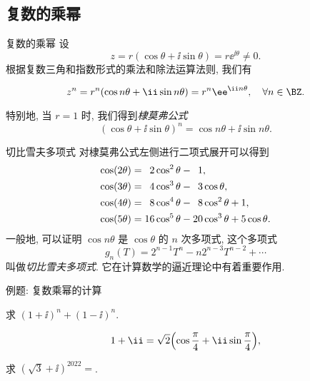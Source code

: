 \subsection{复数的乘幂}


\begin{frame}{复数的乘幂}
	\onslide<+->
	设
	\[
		z=r(\cos\theta+\ii\sin\theta)=r\ee^{\ii\theta}\neq0.
	\]
	\onslide<+->
	根据复数三角和指数形式的乘法和除法运算法则,
	\onslide<+->
	我们有
	\begin{theorem*}[][复数的乘幂]
	\[
		z^n=r^n(\cos{n\theta}+\ii\sin{n\theta})
		=r^n\ee^{\ii n\theta},\quad\forall n\in\BZ.
	\]
	\end{theorem*}
	\onslide<+->
	特别地, 当 $r=1$ 时, 我们得到\emph{棣莫弗公式}
	\[
		(\cos\theta+\ii\sin\theta)^n=\cos{n\theta}+\ii\sin{n\theta}.
	\]
\end{frame}


\begin{frame}{切比雪夫多项式\noexer}
	\onslide<+->
	对棣莫弗公式左侧进行二项式展开可以得到
	\begin{align*}
		\cos(2\theta)&=\hphantom{1}2\cos^2\theta-\hphantom{1}1,\\
		\cos(3\theta)&=\hphantom{1}4\cos^3\theta-\hphantom{1}3\cos\theta,\\
		\cos(4\theta)&=\hphantom{1}8\cos^4\theta-\hphantom{1}8\cos^2\theta+1,\\
		\cos(5\theta)&=16\cos^5\theta-20\cos^3\theta+5\cos\theta.
	\end{align*}
	\onslide<+->
	一般地, 可以证明 $\cos{n\theta}$ 是 $\cos\theta$ 的 $n$ 次多项式,
	\onslide<+->
	这个多项式
	\[
		g_n(T)=2^{n-1}T^n-n2^{n-3}T^{n-2}+\cdots
	\]
	叫做\emph{切比雪夫多项式}.
	\onslide<+->
	它在计算数学的逼近理论中有着重要作用.
\end{frame}


\begin{frame}{例题: 复数乘幂的计算}
	\onslide<+->
	\begin{example}[nearnext]
		求 $(1+\ii)^n+(1-\ii )^n$.
	\end{example}
	\onslide<+->
	\begin{solution}[nearprev]
		\[
			1+\ii=\sqrt2\Bigl(\cos\dfrac\pi4+\ii\sin\dfrac\pi4\Bigr),
		\]
		\onslide<+->{%
			\[
				1-\ii =\sqrt2\Bigl(\cos\dfrac\pi4-\ii \sin\dfrac\pi4\Bigr),
			\]
		}\onslide<+->{%
			\[
				(1+\ii)^n+(1-\ii )^n
				=2^{\frac n2}\Bigl(\cos\dfrac{n\pi}4+\ii\sin\dfrac{n\pi}4+\cos\dfrac{n\pi}4-\ii \sin\dfrac{n\pi}4\Bigr)
				=2^{\frac n2+1}\cos\dfrac{n\pi}4.
			\]
		}%
	\end{solution}
	\onslide<+->
	\begin{exercise}
		求 $(\sqrt3+\ii)^{2022}=$.
	\end{exercise}
\end{frame}


